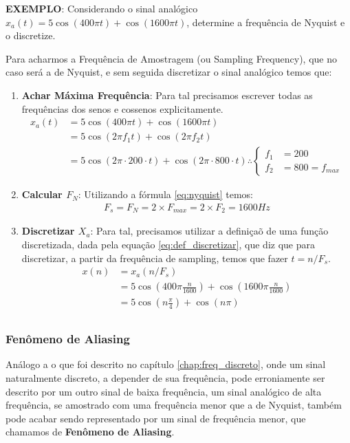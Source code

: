 \documentclass{article}
\begin{document}
\textbf{EXEMPLO}: Considerando o sinal analógico $x_a(t) = 5\cos(400\pi t) + \cos(1600\pi t)$, determine a frequência de Nyquist e o discretize.

Para acharmos a Frequência de Amostragem (ou Sampling Frequency), que no caso será a de Nyquist, e sem seguida discretizar o sinal analógico temos que:
\begin{enumerate}
    \item \textbf{Achar Máxima Frequência}: Para tal precisamos escrever todas as frequências dos senos e cossenos explicitamente.
    \begin{align*}
        x_a(t) &= 5\cos(400\pi t) + \cos(1600\pi t) \\ 
               &= 5\cos(2\pi f_1 t) + \cos (2 \pi f_2 t) \\ 
               &= 5\cos(2\pi \cdot 200 \cdot t) + \cos (2 \pi \cdot 800 \cdot t) \therefore \begin{cases}
                   f_1 &= 200 \\ f_2  &= 800 = f_{max}
               \end{cases}
    \end{align*}

    \item \textbf{Calcular $F_N$}: Utilizando a fórmula \ref{eq:nyquist} temos:
        \begin{align*}
            F_s = F_N = 2 \times F_{max} = 2\times F_2 = 1600 Hz
        \end{align*}

    \item \textbf{Discretizar $X_a$}: Para tal, precisamos utilizar a definiçaõ de uma função discretizada, dada pela equação \ref{eq:def_discretizar}, que diz que para discretizar, a partir da frequência de sampling, temos que fazer $t = n/F_s$.
    \begin{align*}
        x(n) &= x_a(n/F_s) \\ 
             &= 5\cos\left(400\pi \frac{n}{1600}\right) + \cos\left(1600\pi \frac{n}{1600}\right) \\
             &= 5\cos\left(n\frac{\pi}{4}\right) + \cos(n\pi) \\
    \end{align*}
\end{enumerate}


\subsubsection{Fenômeno de Aliasing}
Análogo a o que foi descrito no capítulo \ref{chap:freq_discreto}, onde um sinal naturalmente discreto, a depender de sua frequência, pode erroniamente ser descrito por um outro sinal de baixa frequência, um sinal analógico de alta frequência, se amostrado com uma frequência menor que a de Nyquist, também pode acabar sendo representado por um sinal de frequência menor, que chamamos de \textbf{Fenômeno de Aliasing}.
\end{document}
